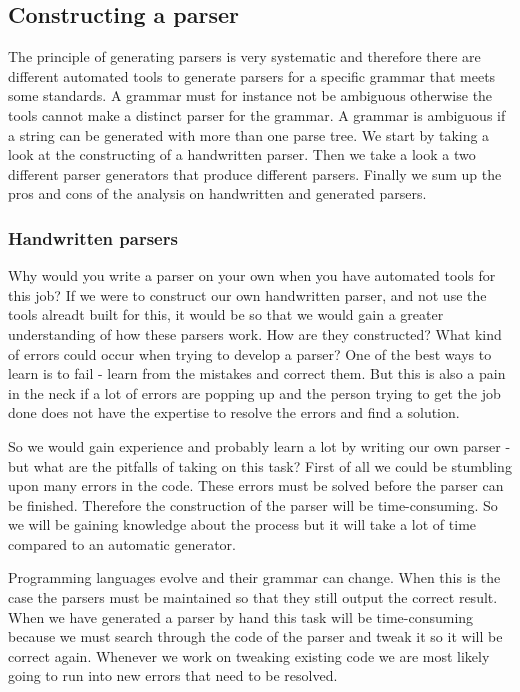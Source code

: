 \subsection{Constructing a parser}
\label{sec:ana-parsers}
The principle of generating parsers is very systematic and therefore there are different automated tools to generate parsers for a specific grammar that meets some standards. A grammar must for instance not be ambiguous otherwise the tools cannot make a distinct parser for the grammar. A grammar is ambiguous if a string can be generated with more than one parse tree. We start by taking a look at the constructing of a handwritten parser. Then we take a look a two different parser generators that produce different parsers. Finally we sum up the pros and cons of the analysis on handwritten and generated parsers. 

\subsubsection{Handwritten parsers}
\label{sec:handparser}
Why would you write a parser on your own when you have automated tools for this job? If we were to construct our own handwritten parser, and not use the tools alreadt built for this, it would be so that we would gain a greater understanding of how these parsers work. How are they constructed? What kind of errors could occur when trying to develop a parser? One of the best ways to learn is to fail - learn from the mistakes and correct them. But this is also a pain in the neck if a lot of errors are popping up and the person trying to get the job done does not have the expertise to resolve the errors and find a solution.

So we would gain experience and probably learn a lot by writing our own parser - but what are the pitfalls of taking on this task? First of all we could be stumbling upon many errors in the code. These errors must be solved before the parser can be finished. Therefore the construction of the parser will be time-consuming. So we will be gaining knowledge about the process but it will take a lot of time compared to an automatic generator.

Programming languages evolve and their grammar can change. When this is the case the parsers must be maintained so that they still output the correct result. When we have generated a parser by hand this task will be time-consuming because we must search through the code of the parser and tweak it so it will be correct again. Whenever we work on tweaking existing code we are most likely going to run into new errors that need to be resolved. 

